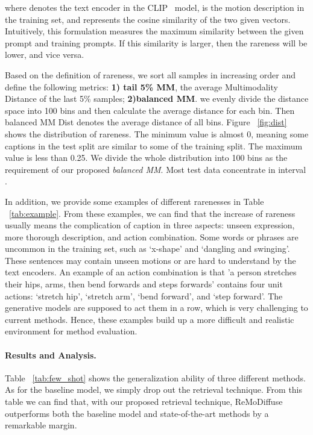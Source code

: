 \documentclass[10pt,twocolumn,letterpaper]{article}
\newcommand{\name}{ReMoDiffuse\xspace}
\begin{document}
where  denotes the text encoder in the CLIP~\cite{radford2021learning} model,  is the motion description in the training set, and  represents the cosine similarity of the two given vectors. Intuitively, this formulation measures the maximum similarity between the given prompt and training prompts. If this similarity is larger, then the rareness will be lower, and vice versa.

Based on the definition of rareness, we sort all samples in increasing order and define the following metrics: \textbf{1) tail 5\% MM}, the average Multimodality Distance of the last 5\% samples; \textbf{2)balanced MM}. we evenly divide the distance space into 100 bins and then calculate the average distance for each bin. Then balanced MM Dist denotes the average distance of all bins. Figure ~\ref{fig:dist} shows the distribution of rareness. The minimum value is almost 0, meaning some captions in the test split are similar to some of the training split. The maximum value is less than 0.25. We divide the whole distribution into 100 bins as the requirement of our proposed \textit{balanced MM}. Most test data concentrate in interval .

In addition, we provide some examples of different rarenesses in Table ~\ref{tab:example}. From these examples, we can find that the increase of rareness usually means the complication of caption in three aspects: unseen expression, more thorough description, and action combination. Some words or phrases are uncommon in the training set, such as `x-shape' and `dangling and swinging'. These sentences may contain unseen motions or are hard to understand by the text encoders. An example of an action combination is that 'a person stretches their hips, arms, then bend forwards and steps forwards' contains four unit actions: `stretch hip', `stretch arm', `bend forward', and `step forward'. The generative models are supposed to act them in a row, which is very challenging to current methods. Hence, these examples build up a more difficult and realistic environment for method evaluation.

\paragraph{Results and Analysis.} Table ~\ref{tab:few_shot} shows the generalization ability of three different methods. As for the baseline model, we simply drop out the retrieval technique. From this table we can find that, with our proposed retrieval technique, \name outperforms both the baseline model and state-of-the-art methods by a remarkable margin. 
\end{document}
